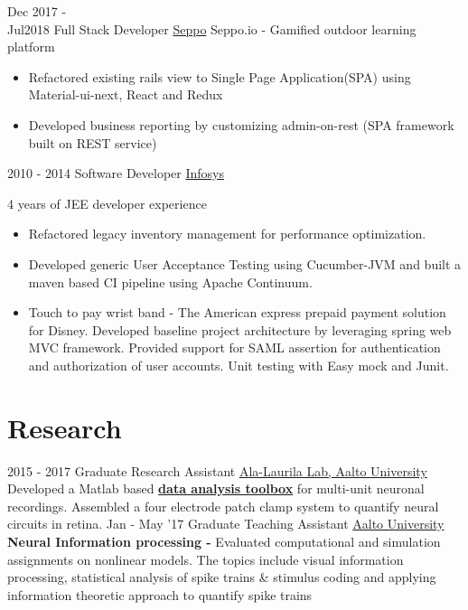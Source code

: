 \documentclass[letterpaper]{twentysecondcv} %
\begin{document}
\begin{twenty} %
       
	\twentyitem
    	{Dec 2017 - \\Jul2018}
        {Full Stack Developer}
        {\href{http://www.seppo.io/}{Seppo}}
        {Seppo.io - Gamified outdoor learning platform}
        {
        {\begin{itemize}
        \item Refactored existing rails view to Single Page Application(SPA) using Material-ui-next, React and Redux 
        \item Developed business reporting by customizing admin-on-rest (SPA framework built on REST service)
    \end{itemize}}
        }
        
     \twentyitem
   		{2010 - 2014}
        {Software Developer}
        {\href{http://www.infosys.com/}{Infosys}}
        {}
        {4 years of JEE developer experience \\ 
        \begin{itemize}
        \item  Refactored legacy inventory management for performance optimization. 
        \item Developed generic User Acceptance Testing using Cucumber-JVM and built a maven based CI pipeline using Apache Continuum.  
        \item Touch to pay wrist band - The American express prepaid payment solution for Disney. Developed baseline project architecture by leveraging spring web MVC framework.
Provided support for SAML assertion for authentication and authorization of user accounts. Unit testing with Easy mock and Junit.
        \end{itemize}
    	}
        
\end{twenty}


\section{Research}
\begin{twenty}
	\twentyitem
    	{2015 - 2017}
        {Graduate Research Assistant}
        {\href{http://ala-laurila.biosci.helsinki.fi/}{Ala-Laurila Lab, Aalto University}}
        {}
        {
        {\\Developed a Matlab based \href{https://github.com/Schwartz-AlaLaurila-Labs/sa-labs-analysis}{\textbf{data analysis toolbox}} for multi-unit neuronal recordings. Assembled a four electrode patch clamp system to quantify neural circuits in retina.}
        }
    \twentyitem
   		{Jan - May '17}
        {Graduate Teaching Assistant}
        {\href{http://www.aalto.fi}{Aalto University}}
        {}
        {
        {\\\textbf{Neural Information processing - }Evaluated computational and simulation assignments on  nonlinear models. The topics include visual information processing, statistical analysis of spike trains \& stimulus coding and applying information theoretic approach to quantify spike trains
    }
        }
\end{twenty}
\end{document}
